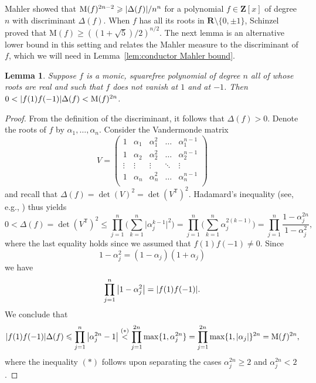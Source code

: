 \documentclass[12pt,reqno]{amsart}
\theoremstyle{definition}
\theoremstyle{plain}
\newtheorem{lemma}[theorem]{Lemma}
\theoremstyle{definition}
\newcommand{\Z}{\mathbf{Z}}
\newcommand{\R}{\mathbf{R}}
\newcommand{\MM}{\mathrm{M}}
\renewcommand{\geq}{\geqslant}
\renewcommand{\leq}{\leqslant}
\DeclarePairedDelimiter\abs{\lvert}{\rvert}
\begin{document}
Mahler \cite{Mahler} showed that $\MM(f)^{2n-2} \geq \abs{\Delta(f)}/n^n$ for a polynomial $f \in \Z[x]$ of degree $n$ with discriminant $\Delta(f)$. When $f$ has all its roots in $\R \setminus \{0, \pm 1\}$, Schinzel \cite{Schinzel} proved that $\MM(f) \geq ((1+\sqrt{5})/2)^{n/2}$. The next lemma is an alternative lower bound in this setting and relates the Mahler measure to the discriminant of $f$, which we will need in Lemma~\ref{lem:conductor Mahler bound}.

\begin{lemma}
\label{lem:disc Mahler bound}
Suppose $f$ is a monic, squarefree polynomial of degree $n$ all of whose roots are real and such that $f$ does not vanish at $1$ and at $-1$. Then $0 < \abs{f(1)f(-1)}\Delta(f) < \MM(f)^{2n}$.
\end{lemma}
\begin{proof}
From the definition of the discriminant, it follows that $\Delta(f) > 0$. Denote the roots of $f$ by $\alpha_1, \ldots, \alpha_n$. Consider the Vandermonde matrix
\begin{equation*}
V = \begin{pmatrix}
1 & \alpha_1 & \alpha_1^2 & \dots & \alpha_1^{n-1}\\
1 & \alpha_2 & \alpha_2^2 & \dots & \alpha_2^{n-1}\\
\vdots & \vdots & \vdots & \ddots &\vdots \\
1 & \alpha_n & \alpha_n^2 & \dots & \alpha_n^{n-1}\\
\end{pmatrix}
\end{equation*}
and recall that $\Delta(f) = \det(V)^2 = \det(V^{\mathsf{T}})^2$. Hadamard's inequality (see, e.g., \cite[Lemma 2.7]{BrunaultZudilin}) thus yields
\begin{equation*}
0 < \Delta(f) = \det(V^{\mathsf{T}})^2 \leq \prod_{j=1}^n 
\Big( \sum_{k=1}^n \big|\alpha_j^{k-1}\big|^2 \Big)  
= \prod_{j=1}^n \Big( \sum_{k=1}^n \alpha_j^{2(k-1)} \Big) = \prod_{j=1}^n \frac{1-\alpha_j^{2n}}{1-\alpha_j^2},
\end{equation*}
where the last equality holds since we assumed that $f(1)f(-1) \neq 0$.
Since $$1-\alpha_j^2 = (1-\alpha_j)(1+\alpha_j)$$ we have $$\prod\limits_{j=1}^n \big|{1-\alpha_j^2}\big| = \abs{f(1)f(-1)}.$$ We conclude that 
\begin{equation*}
\abs{f(1)f(-1)}\Delta(f) \leq \prod_{j=1}^n \big|\alpha_j^{2n}-1\big| \overset{(\ast)}{<} \prod_{j=1}^{2n} \max \{1, \alpha_j^{2n}\} = \prod_{j=1}^{2n} \max \{1, \abs{\alpha_j}\}^{2n} = \MM(f)^{2n},
\end{equation*}
where the inequality $(\ast)$ follows upon separating the cases $\alpha_j^{2n} \geq 2$ and $ \alpha_j^{2n} < 2$. 
\end{proof}
\end{document}
